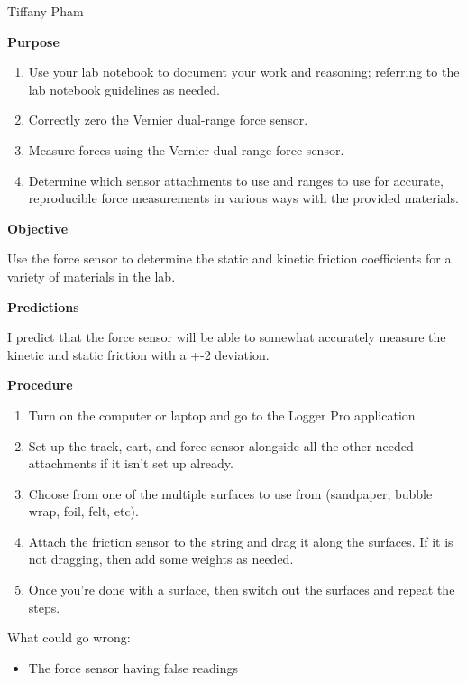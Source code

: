 \documentclass[idxtotoc,hyperref,openany]{labbook} %
\begin{document}

\vspace{-5mm}
Tiffany Pham

\textbf{Purpose}
\begin{enumerate}
    \item Use your lab notebook to document your work and reasoning; referring to the lab notebook guidelines as needed.
    \item Correctly zero the Vernier dual-range force sensor.
    \item Measure forces using the Vernier dual-range force sensor.
    \item Determine which sensor attachments to use and ranges to use for accurate, reproducible force measurements in various ways with the provided materials.
\end{enumerate}

\hfill \break
\textbf{Objective}

Use the force sensor to determine the static and kinetic friction coefficients for a variety
of materials in the lab.

\hfill \break
\textbf{Predictions}

I predict that the force sensor will be able to somewhat accurately measure the kinetic and static friction with a +-2 deviation.

\hfill \break
\textbf{Procedure}
\begin{enumerate}
    \item Turn on the computer or laptop and go to the Logger Pro application.
    \item Set up the track, cart, and force sensor alongside all the other needed attachments if it isn't set up already.
    \item Choose from one of the multiple surfaces to use from (sandpaper, bubble wrap, foil, felt, etc).
    \item Attach the friction sensor to the string and drag it along the surfaces. If it is not dragging, then add some weights as needed.
    \item Once you're done with a surface, then switch out the surfaces and repeat the steps.
\end{enumerate}

\hfill \break
What could go wrong:
\begin{itemize}
    \item The force sensor having false readings
\end{itemize}
\end{document}
